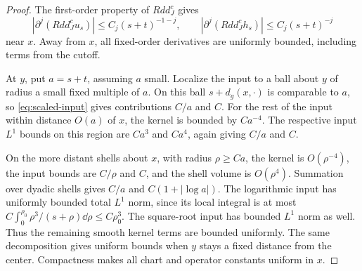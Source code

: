 \begin{proof}
The first-order property of \(Rdd_J^c\) gives
\[
|\partial^j(Rdd_J^cu_s)|\le C_j(s+t)^{-1-j},\qquad
|\partial^j(Rdd_J^ch_s)|\le C_j(s+t)^{-j}
\]
near \(x\). Away from \(x\), all fixed-order derivatives are
uniformly bounded, including terms from the cutoff.

At \(y\), put \(a=s+t\), assuming \(a\) small. Localize the
input to a ball about \(y\) of radius a small fixed multiple
of \(a\). On this ball \(s+d_g(x,\cdot)\) is comparable to
\(a\), so \eqref{eq:scaled-input} gives contributions \(C/a\)
and \(C\). For the rest of the input within distance \(O(a)\)
of \(x\), the kernel is bounded by \(Ca^{-4}\). The respective
input \(L^1\) bounds on this region are \(Ca^3\) and \(Ca^4\),
again giving \(C/a\) and \(C\).

On the more distant shells about \(x\), with radius
\(\rho\ge Ca\), the kernel is \(O(\rho^{-4})\), the input
bounds are \(C/\rho\) and \(C\), and the shell volume is
\(O(\rho^4)\). Summation over dyadic shells gives \(C/a\)
and \(C(1+|\log a|)\). The logarithmic input has uniformly
bounded total \(L^1\) norm, since its local integral is at most
\(C\int_0^{\rho_0}\rho^3/(s+\rho)\dd\rho\le C\rho_0^3\).
The square-root input has bounded \(L^1\) norm as well.
Thus the remaining smooth kernel terms are bounded uniformly.
The same decomposition gives uniform bounds
when \(y\) stays a fixed distance from the center.
Compactness makes all chart and operator constants uniform
in \(x\).
\end{proof}

